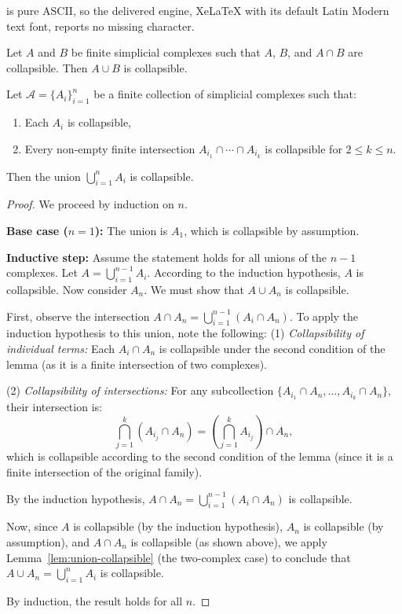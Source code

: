 \documentclass[10pt,a4paper]{amsart}
\begin{document}
is pure ASCII, so the delivered engine, XeLaTeX with its default Latin Modern text font, reports no missing character.
\begin{lemma}
\label{lem:union-collapsible}
Let \( A \) and \( B \) be finite simplicial complexes such that \( A \), \( B \), and \( A \cap B \) are collapsible. Then \( A \cup B \) is collapsible.
\end{lemma}

\begin{lemma}
\label{lem:finite-union-collapsible}
Let \( \mathcal{A} = \{A_i\}_{i=1}^n \) be a finite collection of simplicial complexes such that:
\begin{enumerate}
    \item Each \( A_i \) is collapsible,
    \item Every non-empty finite intersection \( A_{i_1} \cap \cdots \cap A_{i_k} \) is collapsible for \(2\leq k\leq n\).
\end{enumerate}
Then the union \( \bigcup_{i=1}^n A_i \) is collapsible.
\end{lemma}

\begin{proof}
We proceed by induction on \( n \).

\textbf{Base case (\( n = 1 \)):}  
The union is \( A_1 \), which is collapsible by assumption.

\textbf{Inductive step:}  
Assume the statement holds for all unions of the \( n-1 \) complexes. Let \( A = \bigcup_{i=1}^{n-1} A_i \). According to the induction hypothesis, \( A \) is collapsible. Now consider \( A_n \). We must show that \( A \cup A_n \) is collapsible.

First, observe the intersection \( A \cap A_n = \bigcup_{i=1}^{n-1} (A_i \cap A_n) \). To apply the induction hypothesis to this union, note the following:
(1) \emph{Collapsibility of individual terms:} Each \( A_i \cap A_n \) is collapsible under the second condition of the lemma (as it is a finite intersection of two complexes).

(2) \emph{Collapsibility of intersections:} For any subcollection \( \{A_{i_1} \cap A_n, \dots, A_{i_k} \cap A_n\} \), their intersection is:
\[
\bigcap_{j=1}^k (A_{i_j} \cap A_n) = \left(\bigcap_{j=1}^k A_{i_j}\right) \cap A_n,
\]
which is collapsible according to the second condition of the lemma (since it is a finite intersection of the original family).

By the induction hypothesis, \( A \cap A_n = \bigcup_{i=1}^{n-1} (A_i \cap A_n) \) is collapsible.

Now, since \( A \) is collapsible (by the induction hypothesis), \( A_n \) is collapsible (by assumption), and \( A \cap A_n \) is collapsible (as shown above), we apply Lemma~\ref{lem:union-collapsible} (the two-complex case) to conclude that \( A \cup A_n = \bigcup_{i=1}^n A_i \) is collapsible. 

By induction, the result holds for all \( n \).

\end{proof}
\end{document}
